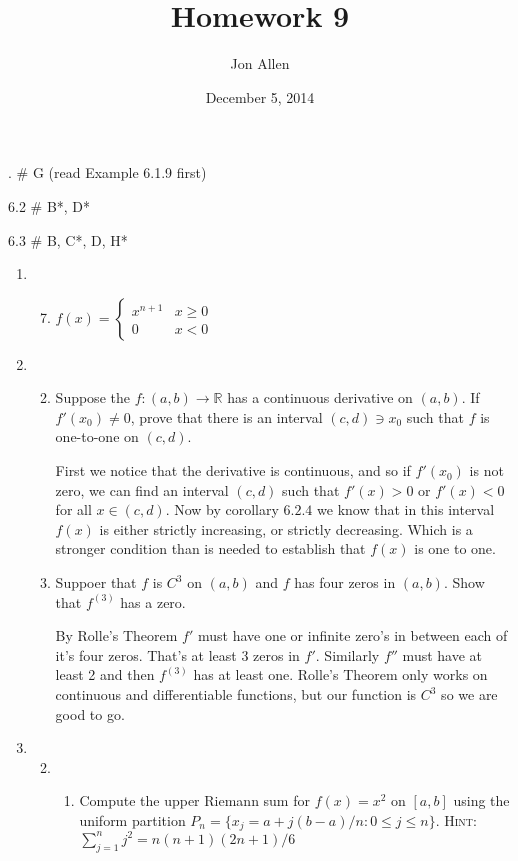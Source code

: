 \documentclass[letterpaper]{article}
\begin{document}
\title{Homework 9}
\date{December 5, 2014}
\author{Jon Allen}
. \# G (read Example 6.1.9 first)

6.2  \# B*, D*

6.3 \# B, C*, D, H*
\renewcommand{\labelenumi}{6.\arabic{enumi}}
\renewcommand{\labelenumii}{\Alph{enumii}.}
\renewcommand{\labelenumiii}{(\alph{enumiii})}
\begin{enumerate}
\item
  \begin{enumerate}
  \setcounter{enumii}{6}
  \item
    $f(x)=\begin{cases}x^{n+1}&x\ge0\\0&x<0\end{cases}$
  \end{enumerate}
\item
  \begin{enumerate}
  \setcounter{enumii}{1}
  \item
  Suppose  the $f:(a,b)\to\mathbb{R}$ has a continuous derivative on $(a,b)$. If $f'(x_0)\ne0$, prove that there is an interval $(c,d)\ni x_0$ such that $f$ is one-to-one on $(c,d)$.

  First we notice that the derivative is continuous, and so if $f'(x_0)$ is not zero, we can find an interval $(c,d)$ such that $f'(x)>0$ or $f'(x)<0$ for all $x\in(c,d)$. Now by corollary $6.2.4$ we know that in this interval $f(x)$ is either strictly increasing, or strictly decreasing. Which is a stronger condition than is needed to establish that $f(x)$ is one to one.
  \setcounter{enumii}{3}
  \item
  Suppoer that $f$ is $C^3$ on $(a,b)$ and $f$ has four zeros in $(a,b)$. Show that $f^{(3)}$ has a zero.

  By Rolle's Theorem $f'$ must have one or infinite zero's in between each of it's four zeros. That's at least 3 zeros in $f'$. Similarly $f''$ must have at least 2 and then $f^{(3)}$ has at least one. Rolle's Theorem only works on continuous and differentiable functions, but our function is $C^3$ so we are good to go.
  \end{enumerate}
\item
  \begin{enumerate}
  \setcounter{enumii}{1}
  \item
    \begin{enumerate}
    \item
    Compute the upper Riemann sum for $f(x)=x^2$ on $[a,b]$ using the uniform partition $P_n=\{x_j=a+j(b-a)/n:0\le j\le n\}$. {\scshape Hint}: $\sum_{j=1}^n{j^2}=n(n+1)(2n+1)/6$


\end{enumerate}
\end{enumerate}
\end{enumerate}
\end{document}
